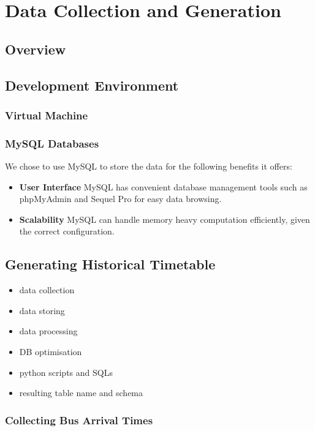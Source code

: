 \chapter{Data Collection and Generation}
\label{ch:data_generation}
\section{Overview}


\section{Development Environment}
\subsection{Virtual Machine}

\subsection{MySQL Databases}
\par We chose to use MySQL to store the data for the following benefits it offers:

\begin{itemize}
  \item \textbf{User Interface} MySQL has convenient database management tools such as phpMyAdmin\cite{phpmyadmin} and Sequel Pro\cite{sequel_pro} for easy data browsing.
  \item \textbf{Scalability} MySQL can handle memory heavy computation efficiently, given the correct configuration.
\end{itemize}

\section{Generating Historical Timetable}
\begin{itemize}
  \item data collection
  \item data storing
  \item data processing
  \item DB optimisation
  \item python scripts and SQLs
  \item resulting table name and schema
\end{itemize}

\subsection{Collecting Bus Arrival Times}
\label{sec:collecting_arrival_times}

